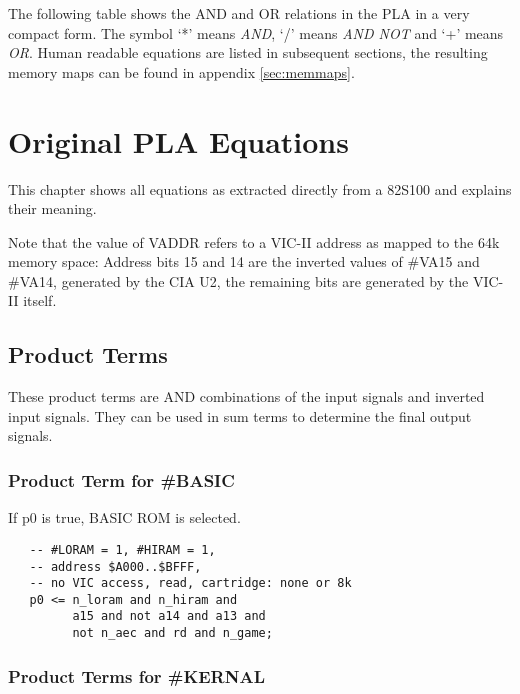 The following table shows the AND and OR relations in the PLA in a very
compact form. The symbol `*' means \textit{AND}, `/' means \textit{AND NOT}
and `+' means \textit{OR}. Human readable equations are listed in subsequent
sections, the resulting memory maps can be found in appendix \ref{sec:memmaps}.

\tabletextsize
\begin{center}
    \begin{minipage}{0.8\linewidth}
        
    \end{minipage}
\end{center}
\normalsize

\section{Original PLA Equations}

This chapter shows all equations as extracted directly from a 82S100 and
explains their meaning.

Note that the value of VADDR refers to a VIC-II address as mapped to the 64k
memory space: Address bits 15 and 14 are the inverted values of
\#VA15 and \#VA14, generated by the CIA U2, the remaining bits are generated by
the VIC-II itself.

\subsection{Product Terms}
\label{sec:pterms}

These product terms are AND combinations of the input signals and inverted
input signals. They can be used in sum terms to determine the final output
signals.

\subsubsection{Product Term for \#BASIC}

If p0 is true, BASIC ROM is selected.

\begin{lstlisting}
   -- #LORAM = 1, #HIRAM = 1,
   -- address $A000..$BFFF,
   -- no VIC access, read, cartridge: none or 8k
   p0 <= n_loram and n_hiram and
         a15 and not a14 and a13 and
         not n_aec and rd and n_game;
\end{lstlisting}

\subsubsection{Product Terms for \#KERNAL}

